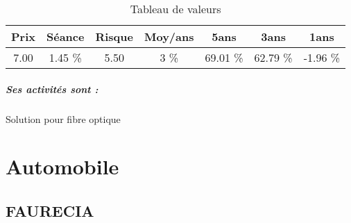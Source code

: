 \documentclass[11pt,a4paper]{report}%
\begin{document}
\begin{table}[H]
  \centering
    \begin{tabular}{|c|c|c|c|c|c|c|}
    \hline
    Prix & Séance & Risque  & Moy/ans & 5ans & 3ans & 1ans \\
    \hline
    7.00 &    1.45 \%    & 5.50 & 3 \% & 69.01 \% & 62.79 \% & -1.96 \% \\
    \hline
    \end{tabular}%
        \label{tab:table_EKINOPS}%
      \caption{Tableau de valeurs}
\end{table}%

\paragraph{Ses activités sont : } Solution pour fibre optique 
    
    \newpage\chapter{Automobile}


\section{FAURECIA}
\end{document}
